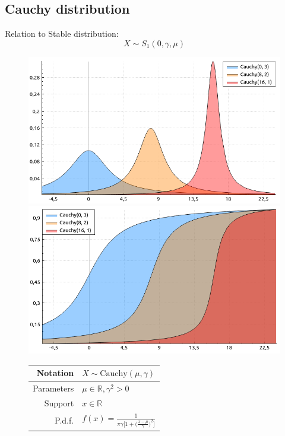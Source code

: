 \documentclass[a4paper,11pt]{article}
\theoremstyle{plain}
\theoremstyle{definition}
\newcommand{\MR}{\mathbb{R}}
\begin{document}
\subsection{Cauchy distribution}
	Relation to Stable distribution:
	\[X \sim S_{1}(0, \gamma, \mu) \]
		\begin{figure}[!htb]\centering
		\begin{minipage}{0.55\textwidth}
			\includegraphics[width=\linewidth, right]{cauchy_pdf}
			\captionsetup{labelformat=empty}
			\includegraphics[width=\linewidth, right]{cauchy_cdf}
			\captionsetup{labelformat=empty}
		\end{minipage}
		\begin{minipage}{0.4\textwidth}
		\begin{tabular}{| r | l |}
			\hline
			Notation & $X \sim \mathrm{Cauchy}(\mu, \gamma)$ \\
			\hline
			Parameters & $\mu \in \MR, \gamma^2 > 0 $ \\
			\hline
			Support & $x \in \MR$  \\
			\hline
			P.d.f. & $f(x)= \frac{1}{ \pi \gamma \Big[ 1 + \big( \frac{x-\mu}{\gamma} \big)^2 \Big]  }  $ \\

\end{tabular}
\end{minipage}
\end{figure}
\end{document}
